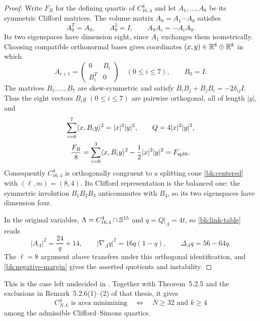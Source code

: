 \begin{proof}
Write $F_R$ for the defining quartic of $C^4_{16,4}$ and let
$A_1,\ldots,A_8$ be its symmetric Clifford matrices. The volume
matrix $A_9=A_1\cdots A_8$ satisfies
\[
 A_9^T=A_9,\qquad A_9^2=I,\qquad A_9A_i=-A_iA_9.
\]
Its two eigenspaces have dimension eight, since $A_1$ exchanges
them isometrically. Choosing compatible orthonormal bases gives
coordinates $(x,y)\in\mathbb R^8\oplus\mathbb R^8$ in which
\[
 A_{i+1}=\begin{pmatrix}0&B_i\\B_i^T&0\end{pmatrix}
 \quad(0\leq i\leq7),\qquad B_0=I.
\]
The matrices $B_1,\ldots,B_7$ are skew-symmetric and satisfy
$B_iB_j+B_jB_i=-2\delta_{ij}I$. Thus the eight vectors $B_i y$
$(0\leq i\leq7)$ are pairwise orthogonal, all of length $|y|$, and
\begin{gather*}
 \sum_{i=0}^7\langle x,B_i y\rangle^2=|x|^2|y|^2,
 \qquad Q=4|x|^2|y|^2,\\
 \frac{F_R}{8}
 =\sum_{i=0}^3\langle x,B_i y\rangle^2
       -\frac12|x|^2|y|^2=F_{\rm split}.
\end{gather*}
Consequently $C^4_{16,4}$ is orthogonally congruent to a splitting
cone \eqref{bh:centered} with $(\ell,m)=(8,4)$.
Its Clifford representation is the balanced one: the symmetric
involution $B_1B_2B_3$ anticommutes with $B_4$, so its two
eigenspaces have dimension four.

In the original variables, $\Lambda=C^4_{16,4}\cap\mathbb S^{15}$ and
$q=Q|_\Lambda=4t$, so \eqref{bh:link-table} reads
\begin{equation}\label{eq:Riedler-16-link}
 |A_\Lambda|^2=\frac{24}{q}+14,\qquad
 |\nabla_\Lambda q|^2=16q(1-q),\qquad
 \Delta_\Lambda q=56-64q.
\end{equation}
The $\ell=8$ argument above transfers under this orthogonal
identification, and \eqref{bh:negative-margin} gives the asserted
quotients and instability.
\end{proof}

This is the case left undecided in
\cite[Remark~5.2.6(3)]{RiedlerThesis25}. Together with
Theorem~5.2.5 and the exclusions in Remark~5.2.6(1)--(2)
of that thesis, it gives
\[
 C^4_{N,k}\text{ is area minimizing}
 \quad\Longleftrightarrow\quad N\geq32\text{ and }k\geq4
\]
among the admissible Clifford--Simons quartics.

